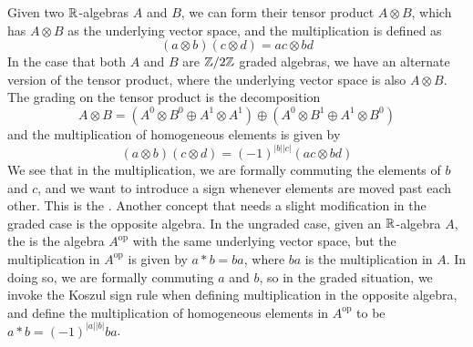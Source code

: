 %
Given two $\mathbb{R}$-algebras $A$ and $B$, we can form their tensor product
$A \otimes B$, which has $A \otimes B$ as the underlying vector space, and the
multiplication is defined as
\[
(a \otimes b)(c \otimes d) = ac \otimes bd
\]
In the case that both $A$ and $B$ are $\mathbb{Z}/2\mathbb{Z}$ graded algebras, we have an alternate
version of the tensor product, where the underlying vector space is also
$A \otimes B$. The grading on the tensor product is the decomposition
\[
A \otimes B = (A^0 \otimes B^0 \oplus A^1 \otimes A^1) \oplus (A^0 \otimes B^1
\oplus A^1 \otimes B^0)
\]
and the multiplication of homogeneous elements is given by
\[
(a \otimes b)(c \otimes d) = (-1)^{|b||c|}(ac \otimes bd)
\]
We see that in the multiplication, we are formally commuting the elements of
$b$ and $c$, and we want to introduce a sign whenever elements are moved past
each other. This is the . Another concept that needs
a slight modification in the graded case is the opposite algebra. In the
ungraded case, given an $\mathbb{R}$-algebra $A$, the  is
the algebra $A^{\text{op}}$ with the same underlying vector space, but
the multiplication in $A^\text{op}$ is given by $a * b = ba$, where $ba$
is the multiplication in $A$. In doing so, we are formally commuting $a$
and $b$, so in the graded situation, we invoke the Koszul sign rule when
defining multiplication in the opposite algebra, and define the multiplication
of homogeneous elements in $A^{\text{op}}$ to be $a * b = (-1)^{|a||b|} ba$.\\

